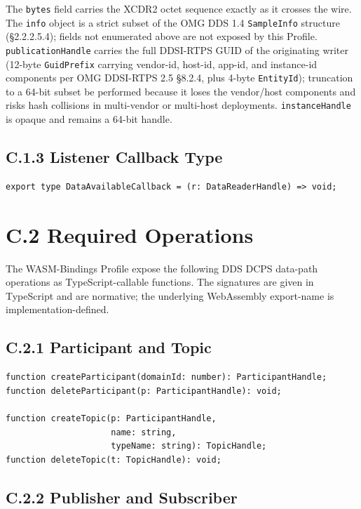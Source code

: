 \documentclass{../styles/zerodds-vendor-spec}
\begin{document}
The \texttt{bytes} field carries the XCDR2 octet sequence
exactly as it crosses the wire. The \texttt{info} object is a
strict subset of the OMG DDS 1.4 \texttt{SampleInfo} structure
(§2.2.2.5.4); fields not enumerated above are not exposed by
this Profile. \texttt{publicationHandle} carries the full
DDSI-RTPS GUID of the originating writer (12-byte
\texttt{GuidPrefix} carrying vendor-id, host-id, app-id, and
instance-id components per OMG DDSI-RTPS 2.5 §8.2.4, plus
4-byte \texttt{EntityId}); truncation to a 64-bit subset
 be performed because it loses the
vendor/host components and risks hash collisions in
multi-vendor or multi-host deployments. \texttt{instanceHandle}
is opaque and remains a 64-bit handle.

\subsection*{C.1.3 Listener Callback Type}

\begin{lstlisting}
export type DataAvailableCallback = (r: DataReaderHandle) => void;
\end{lstlisting}

\section*{C.2 Required Operations}

The WASM-Bindings Profile  expose the following
DDS DCPS data-path operations as TypeScript-callable functions.
The signatures are given in TypeScript and are normative; the
underlying WebAssembly export-name is implementation-defined.

\subsection*{C.2.1 Participant and Topic}

\begin{lstlisting}
function createParticipant(domainId: number): ParticipantHandle;
function deleteParticipant(p: ParticipantHandle): void;

function createTopic(p: ParticipantHandle,
                     name: string,
                     typeName: string): TopicHandle;
function deleteTopic(t: TopicHandle): void;
\end{lstlisting}

\subsection*{C.2.2 Publisher and Subscriber}
\end{document}
